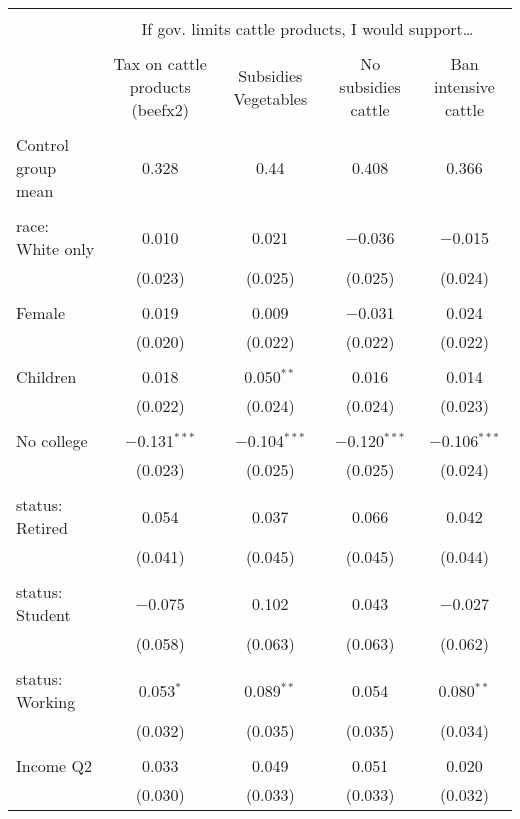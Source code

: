
\begin{tabular}{@{\extracolsep{5pt}}lcccc} 
\\[-1.8ex]\hline 
\hline \\[-1.8ex] 
 & \multicolumn{4}{c}{If gov. limits cattle products, I would support…} \\ 
\cline{2-5} 
\\[-1.8ex] & Tax on cattle products (beefx2) & Subsidies Vegetables & No subsidies cattle & Ban intensive cattle \\ 
\hline \\[-1.8ex] 
 Control group mean & 0.328 & 0.44 & 0.408 & 0.366  \\ \hline \\[-1.8ex] race: White only & 0.010 & 0.021 & $-$0.036 & $-$0.015 \\ 
  & (0.023) & (0.025) & (0.025) & (0.024) \\ 
  & & & & \\ 
 Female & 0.019 & 0.009 & $-$0.031 & 0.024 \\ 
  & (0.020) & (0.022) & (0.022) & (0.022) \\ 
  & & & & \\ 
 Children & 0.018 & 0.050$^{**}$ & 0.016 & 0.014 \\ 
  & (0.022) & (0.024) & (0.024) & (0.023) \\ 
  & & & & \\ 
 No college & $-$0.131$^{***}$ & $-$0.104$^{***}$ & $-$0.120$^{***}$ & $-$0.106$^{***}$ \\ 
  & (0.023) & (0.025) & (0.025) & (0.024) \\ 
  & & & & \\ 
 status: Retired & 0.054 & 0.037 & 0.066 & 0.042 \\ 
  & (0.041) & (0.045) & (0.045) & (0.044) \\ 
  & & & & \\ 
 status: Student & $-$0.075 & 0.102 & 0.043 & $-$0.027 \\ 
  & (0.058) & (0.063) & (0.063) & (0.062) \\ 
  & & & & \\ 
 status: Working & 0.053$^{*}$ & 0.089$^{**}$ & 0.054 & 0.080$^{**}$ \\ 
  & (0.032) & (0.035) & (0.035) & (0.034) \\ 
  & & & & \\ 
 Income Q2 & 0.033 & 0.049 & 0.051 & 0.020 \\ 
  & (0.030) & (0.033) & (0.033) & (0.032) \\ 

\end{tabular}
